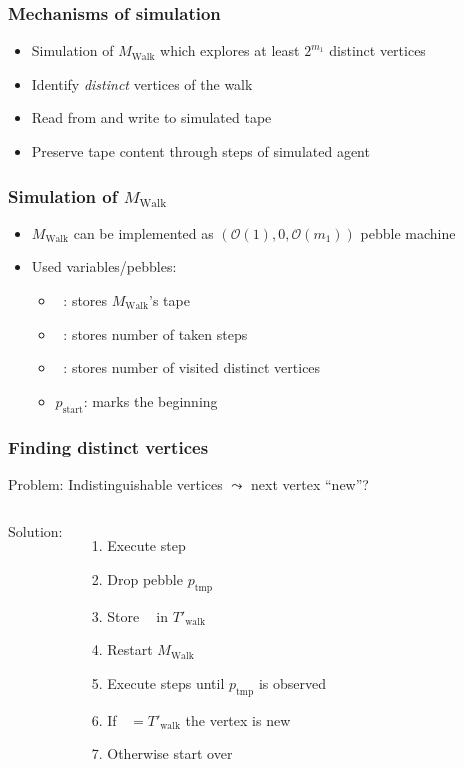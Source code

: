 \documentclass{beamer}
\DeclareMathOperator{\Tid}{T_{\text{id}}}
\DeclareMathOperator{\Tsteps}{T_{\text{steps}}}
\DeclareMathOperator{\Twalk}{T_{\text{walk}}}
\begin{document}
\begin{frame}
  \frametitle{Mechanisms of simulation}
  \begin{itemize}
    \item Simulation of $M_{\text{Walk}}$ which explores at least $2^{m_{1}}$
      distinct vertices
    \item Identify \emph{distinct} vertices of the walk
    \item Read from and write to simulated tape
    \item Preserve tape content through steps of simulated agent
  \end{itemize}
\end{frame}

\begin{frame}
  \frametitle{Simulation of $M_{\text{Walk}}$}
  \begin{itemize}
    \item $M_{\text{Walk}}$ can be implemented as
      $(\mathcal{O}(1), 0, \mathcal{O}(m_{1}))$ pebble machine
    \item Used variables/pebbles:
      \begin{itemize}
        \item $\Twalk$: stores $M_{\text{Walk}}$'s tape
        \item $\Tsteps$: stores number of taken steps
        \item $\Tid$: stores number of visited distinct vertices
        \item $p_{\text{start}}$: marks the beginning
      \end{itemize}
  \end{itemize}
\end{frame}

\begin{frame}
  \frametitle{Finding distinct vertices}
  Problem: Indistinguishable vertices $\leadsto$ next vertex \enquote{new}?
  \begin{columns}
    Solution:
    \begin{enumerate}
      \item Execute step
      \item Drop pebble $p_{\text{tmp}}$
      \item Store $\Twalk$ in $T'_{\text{walk}}$
      \item Restart $M_{\text{Walk}}$
      \item Execute steps until $p_{\text{tmp}}$ is observed
      \item If $\Twalk = T'_{\text{walk}}$ the vertex is new
      \item Otherwise start over
    \end{enumerate}
    
  \end{columns}
\end{frame}
\end{document}
